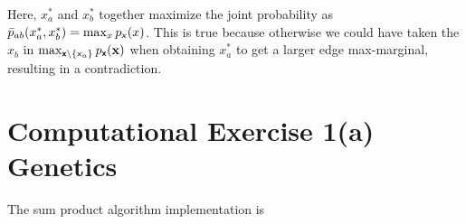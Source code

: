 \documentclass{article}
\newcommand{\s}[1]{\textsf{\textit{#1}}}
\newcommand{\bs}[1]{\textsf{\textbf{#1}}}
\newcommand{\bm}{\mathbf}
\begin{document}
Here, $x_a^*$ and $x_b^*$ together maximize the joint probability as $\bar{p}_{ab}(x_a^*, x_b^*) = \max_{x}p_\s{x}(x)$. This is true because otherwise we could have taken the $x_b$ in $\max_{\bs{x}\backslash\{\s{x}_a\}}p_{\bs{x}}(\bm{x})$ when obtaining $x_a^*$ to get a larger edge max-marginal, resulting in a contradiction. 
\pagebreak

\section*{Computational Exercise 1(a) Genetics}
The sum product algorithm implementation is 
\lstset{language=Python}
\lstset{frame=lines}
\lstset{basicstyle=\footnotesize}
\end{document}
